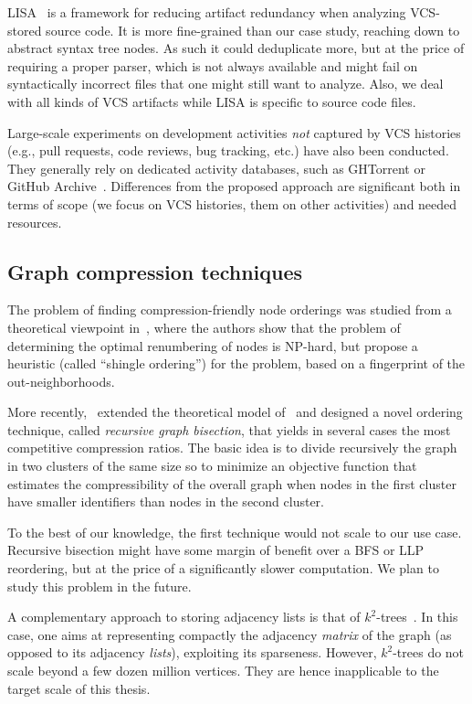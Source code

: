 LISA~\cite{alexandru2019redundancy} is a framework for reducing artifact
redundancy when analyzing VCS-stored source code. It is more fine-grained than
our case study, reaching down to abstract syntax tree nodes. As such it could
deduplicate more, but at the price of requiring a proper parser, which is not
always available and might fail on syntactically incorrect files that one might
still want to analyze. Also, we deal with all kinds of VCS artifacts while LISA
is specific to source code files.

Large-scale experiments on development activities \emph{not} captured by VCS
histories (e.g., pull requests, code reviews, bug tracking, etc.) have also
been conducted. They generally rely on dedicated activity databases, such as
GHTorrent or GitHub Archive~\cite{GHTorrent, ray2014large}. Differences from
the proposed approach are significant both in terms of scope (we focus on VCS
histories, them on other activities) and needed resources.


\subsection{Graph compression techniques}

The problem of finding compression-friendly node orderings was studied from a
theoretical viewpoint in~\cite{CKLCSN}, where the authors show that the problem
of determining the optimal renumbering of nodes is NP-hard, but propose a
heuristic (called ``shingle ordering'') for the problem, based on a fingerprint
of the out-neighborhoods.

More recently,~\cite{DKKCGIRGB} extended the theoretical model of~\cite{CKLCSN}
and designed a novel ordering technique, called \emph{recursive graph
bisection}, that yields in several cases the most competitive compression
ratios. The basic idea is to divide recursively the graph in two clusters of
the same size so to minimize an objective function that estimates the
compressibility of the overall graph when nodes in the first cluster have
smaller identifiers than nodes in the second cluster.

To the best of our knowledge, the first technique would not scale to our use
case. Recursive bisection might have some margin of benefit over a BFS or LLP
reordering, but at the price of a significantly slower computation. We plan to
study this problem in the future.

A complementary approach to storing adjacency lists is that of
$k^2$-trees~\cite{Brisaboa2014152}. In this case, one aims at representing
compactly the adjacency \emph{matrix} of the graph (as opposed to its adjacency
\emph{lists}), exploiting its sparseness.  However, $k^2$-trees do not scale
beyond a few dozen million vertices. They are hence inapplicable to the target
scale of this thesis.

